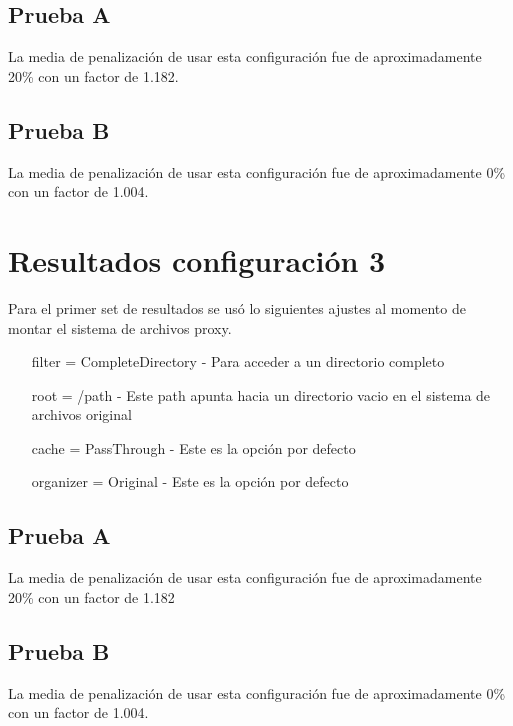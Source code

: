 \subsection{Prueba A}

La media de penalización de usar esta configuración fue de aproximadamente 20\% con un factor de 1.182.


\subsection{Prueba B}

La media de penalización de usar esta configuración fue de aproximadamente 0\% con un factor de 1.004.


\section{Resultados configuración 3}

Para el primer set de resultados se usó lo siguientes ajustes al momento de montar el sistema de archivos proxy.

\begin{itemize}
\item[filter] = CompleteDirectory - Para acceder a un directorio completo
\item[root] = /path - Este path apunta hacia un directorio vacio en el sistema de archivos original
\item[cache] = PassThrough - Este es la opción por defecto
\item[organizer] = Original - Este es la opción por defecto
\end{itemize}

\subsection{Prueba A}

La media de penalización de usar esta configuración fue de aproximadamente 20\% con un factor de 1.182


\subsection{Prueba B}

La media de penalización de usar esta configuración fue de aproximadamente 0\% con un factor de 1.004.




